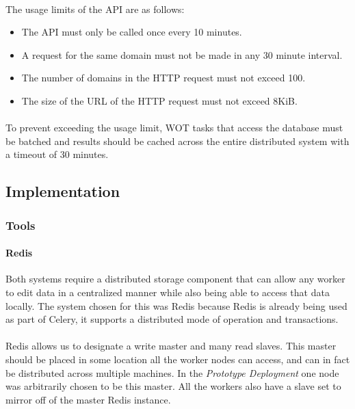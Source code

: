 \paragraph{}
The usage limits of the API are as follows\cite{wot-about}:

\begin{itemize}
    \item The API must only be called once every 10 minutes.
    \item A request for the same domain must not be made in any 30 minute interval.
    \item The number of domains in the HTTP request must not exceed 100.
    \item The size of the URL of the HTTP request must not exceed 8KiB.
\end{itemize}

\paragraph{}
To prevent exceeding the usage limit, WOT tasks that access the database must be batched and results should be cached across the entire distributed system with a timeout of 30 minutes.


\subsection{Implementation}
\subsubsection{Tools}
\paragraph{Redis}
Both systems require a distributed storage component that can allow any worker to edit data in a centralized manner while also being able to access that data locally. The system chosen for this was Redis\cite{redis} because Redis is already being used as part of Celery, it supports a distributed mode of operation and transactions.

\paragraph{}
Redis allows us to designate a write master and many read slaves. This master should be placed in some location all the worker nodes can access, and can in fact be distributed across multiple machines.  In the \emph{Prototype Deployment} one node was arbitrarily chosen to be this master. All the workers also have a slave set to mirror off of the master Redis instance.

